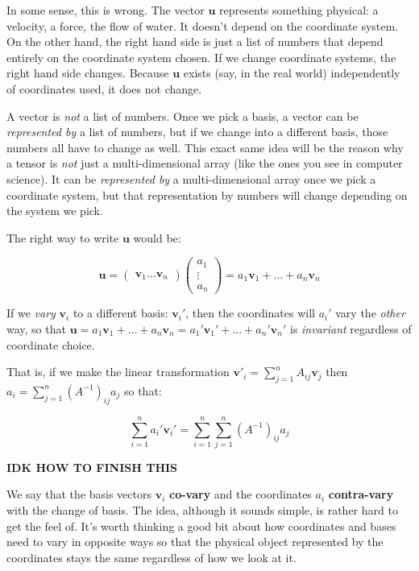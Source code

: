\documentclass[../master.tex]{subfiles}
\begin{document}
	In some sense, this is wrong. The vector $\mathbf u$ represents something physical: a velocity, a force, the flow of water. It doesn't depend on the coordinate system. On the other hand, the right hand side is just a list of numbers that depend entirely on the coordinate system chosen. If we change coordinate systems, the right hand side changes. Because $\mathbf u$ exists (say, in the real world) independently of coordinates used, it does not change. 
	
	A vector is \emph{not} a list of numbers. Once we pick a basis, a vector can be \emph{represented by} a list of numbers, but if we change into a different basis, those numbers all have to change as well. This exact same idea will be the reason why a tensor is \emph{not} just a multi-dimensional array (like the ones you see in computer science). It can be \emph{represented by} a multi-dimensional array once we pick a coordinate system, but that representation by numbers will change depending on the system we pick. 
	
	The right way to write $\mathbf u$ would be:
	
	\begin{equation*}
		\mathbf u = \begin{pmatrix}
			\mathbf v_1  \dots \mathbf v_n
		\end{pmatrix}\begin{pmatrix} a_1 \\ \vdots \\a_n	\end{pmatrix} = a_1 \mathbf v_1 + \dots + a_n \mathbf v_n
	\end{equation*}
	
	If we \emph{vary} $\mathbf v_i$ to a different basis: $\mathbf v_i'$, then the coordinates will $a_i'$ vary the \emph{other} way, so that $\mathbf u = a_1 \mathbf v_1 + \dots + a_n \mathbf v_n = a_1' \mathbf v_1' + \dots + a_n' \mathbf v_n'$ is \emph{invariant} regardless of coordinate choice.
	
	That is, if we make the linear transformation $\mathbf v'_i = \sum_{j=1}^n A_{ij} \mathbf v_j$ then $a_i = \sum_{j=1}^n (A^{-1})_{ij} a_j$ so that:
	
	\begin{equation*}
		\sum_{i=1}^n a_i' \mathbf v_i' = \sum_{i=1}^n \sum_{j=1}^n (A^{-1})_{ij} a_j
	\end{equation*}
	
	\textbf{IDK HOW TO FINISH THIS}
	
	We say that the basis vectors $\mathbf v_i$ \textbf{co-vary} and the coordinates $a_i$ \textbf{contra-vary} with the change of basis. The idea, although it sounds simple, is rather hard to get the feel of. It's worth thinking a good bit about how coordinates and bases need to vary in opposite ways so that the physical object represented by the coordinates stays the same regardless of how we look at it. 
	
\end{document}
